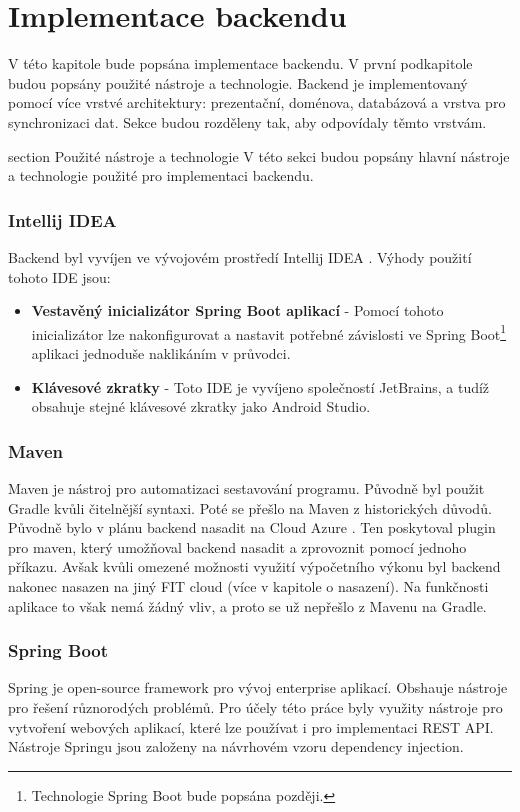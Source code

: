 \chapter{Implementace backendu}
V této kapitole bude popsána implementace backendu. V první podkapitole budou popsány použité nástroje a technologie. Backend je implementovaný pomocí více vrstvé \linebreak architektury: prezentační, doménova, databázová a vrstva pro synchronizaci dat. Sekce budou rozděleny tak, aby odpovídaly těmto vrstvám.

section {Použité nástroje a technologie}
V této sekci budou popsány hlavní nástroje a technologie použité pro implementaci backendu.

\subsection*{Intellij IDEA}
Backend byl vyvíjen ve vývojovém prostředí Intellij IDEA \cite{idea}. Výhody použití tohoto IDE jsou:
	
\begin{itemize}
	\item \textbf{Vestavěný inicializátor Spring Boot aplikací} - Pomocí tohoto inicializátor lze nakonfigurovat a nastavit potřebné závislosti ve Spring Boot\footnote{Technologie Spring Boot bude popsána později.} aplikaci jednoduše naklikáním \linebreak v průvodci.
	
	\item \textbf{Klávesové zkratky} - Toto IDE je vyvíjeno společností JetBrains, a tudíž obsahuje stejné klávesové zkratky jako Android Studio.
\end{itemize}

\subsection*{Maven}
Maven je nástroj pro automatizaci sestavování programu. Původně byl použit Gradle kvůli čitelnější syntaxi. Poté se přešlo na Maven z historických důvodů. Původně bylo v plánu backend nasadit na Cloud Azure \cite{azure}. Ten poskytoval plugin pro maven, který umožňoval backend nasadit a zprovoznit pomocí jednoho příkazu. Avšak kvůli omezené možnosti využití výpočetního výkonu byl backend nakonec nasazen na jiný FIT cloud (více v kapitole o nasazení). Na funkčnosti aplikace to však nemá žádný vliv, a proto se už nepřešlo z Mavenu na Gradle. 

\subsection*{Spring Boot}
Spring je open-source framework pro vývoj enterprise aplikací. Obshauje nástroje pro řešení různorodých problémů. Pro účely této práce byly využity nástroje pro vytvoření webových \linebreak aplikací, které lze používat i pro implementaci REST API. Nástroje Springu jsou založeny na návrhovém vzoru dependency injection.

